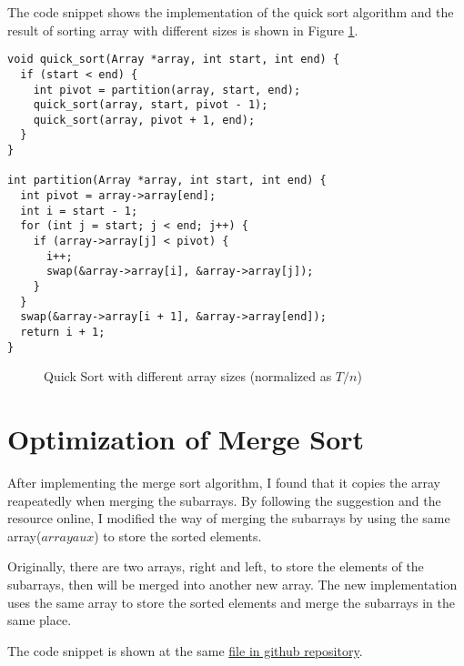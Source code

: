 \documentclass[a4paper,11pt]{article}
\begin{document}
The code snippet shows the implementation of the quick sort algorithm and the result of sorting
array with different sizes is shown in Figure \ref{fig:quick-sort}.

\begin{verbatim}
void quick_sort(Array *array, int start, int end) {
  if (start < end) {
    int pivot = partition(array, start, end);
    quick_sort(array, start, pivot - 1);
    quick_sort(array, pivot + 1, end);
  }
}

int partition(Array *array, int start, int end) {
  int pivot = array->array[end];
  int i = start - 1;
  for (int j = start; j < end; j++) {
    if (array->array[j] < pivot) {
      i++;
      swap(&array->array[i], &array->array[j]);
    }
  }
  swap(&array->array[i + 1], &array->array[end]);
  return i + 1;
}
\end{verbatim}

\begin{figure}[H]
  \centering
  \caption{Quick Sort with different array sizes (normalized as $T/n$)}
  \label{fig:quick-sort}
\end{figure}

\section*{Optimization of Merge Sort}

After implementing the merge sort algorithm, I found that it copies the array reapeatedly
when merging the subarrays. By following the suggestion and the resource online, I modified
the way of merging the subarrays by using the same array($array aux$) to store the sorted elements.

Originally, there are two arrays, right and left, to store the elements of the subarrays, then will
be merged into another new array. The new implementation uses the same array to store the sorted elements
and merge the subarrays in the same place.

The code snippet is shown at the same \href{https://github.com/zebra314/ID1021-Algorithms-and-Data-Structures/blob/main/assignment\_4/merge\_sort.c}{file in github repository}.
\end{document}
